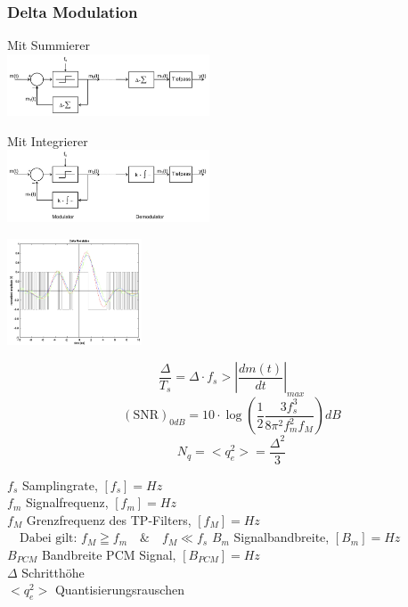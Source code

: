 \subsubsection{Delta Modulation }
\begin{minipage}{6cm}
	Mit Summierer\\
\includegraphics[width = 6cm]{bilder/dig_delta_modulator_schema_sum}
\end{minipage}
\hspace{0.5cm}
\begin{minipage}{6cm}
	Mit Integrierer\\
	\includegraphics[width = 6cm] {bilder/dig_delta_modulator_schema_int}
\end{minipage}
\hspace{0.5cm}
\begin{minipage}{4cm}
\includegraphics[width = 4cm] {bilder/dig_delta_modulation}
\end{minipage}

\begin{minipage}{9cm}
	\[\frac{\Delta}{T_s} = \Delta \cdot f_s > \left| \frac{d m(t)}{dt} \right|_{max}\]
	\[(\text{SNR})_{0dB} = 10 \cdot \log\left(\frac{1}{2}\frac{3 f_s^3}{8 \pi^2 f_m^2 f_M}\right) dB\]
	\[N_q = <q_e^2> = \frac{\Delta^2}{3}\] 
\end{minipage}
\begin{minipage}{9cm}
	$f_s$ Samplingrate, $[f_s] = Hz$ \\
	$f_m$ Signalfrequenz, $[f_m] = Hz$ \\
	$f_M$ Grenzfrequenz des TP-Filters, $[f_M] = Hz$ \\
	$ \quad \text{Dabei gilt: }f_M \geqq f_m \quad \& \quad f_M \ll f_s$
	$B_m$ Signalbandbreite, $[B_m] = Hz $ \\
	$B_{PCM}$ Bandbreite PCM Signal, $[B_{PCM}] = Hz $\\
	$\Delta$ Schritthöhe\\
	$<q_e^2>$ Quantisierungsrauschen \\
\end{minipage}

